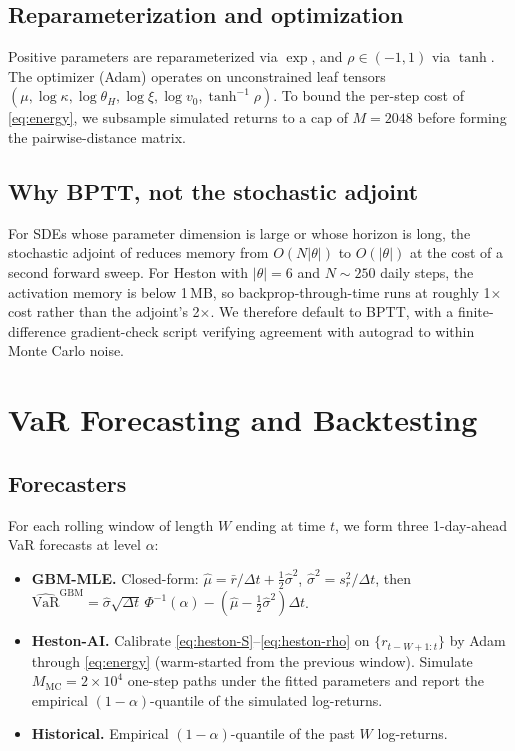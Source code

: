 \documentclass[11pt]{article}
\begin{document}
\subsection{Reparameterization and optimization}

Positive parameters are reparameterized via $\exp$, and $\rho \in (-1, 1)$
via $\tanh$. The optimizer (Adam) operates on unconstrained leaf tensors
$(\mu, \log\kappa, \log\theta_{\!H}, \log\xi, \log v_0, \tanh^{-1}\rho)$. To
bound the per-step cost of \eqref{eq:energy}, we subsample simulated returns
to a cap of $M = 2048$ before forming the pairwise-distance matrix.

\subsection{Why BPTT, not the stochastic adjoint}

For SDEs whose parameter dimension is large or whose horizon is long, the
stochastic adjoint of \cite{li2020adjointsde} reduces memory from
$O(N \lvert\theta\rvert)$ to $O(\lvert\theta\rvert)$ at the cost of a second
forward sweep. For Heston with $\lvert\theta\rvert = 6$ and $N \sim 250$
daily steps, the activation memory is below 1\,MB, so backprop-through-time
runs at roughly 1$\times$ cost rather than the adjoint's 2$\times$. We
therefore default to BPTT, with a finite-difference gradient-check script
verifying agreement with autograd to within Monte Carlo noise.

\section{VaR Forecasting and Backtesting}
\label{sec:var}

\subsection{Forecasters}

For each rolling window of length $W$ ending at time $t$, we form three
1-day-ahead VaR forecasts at level $\alpha$:
\begin{itemize}
\item \textbf{GBM-MLE.} Closed-form: $\hat\mu = \bar r / \Delta t +
  \tfrac{1}{2}\hat\sigma^2$, $\hat\sigma^2 = s_r^2 / \Delta t$, then
  $\widehat{\mathrm{VaR}}^{\mathrm{GBM}} = \hat\sigma\sqrt{\Delta t}\,
  \Phi^{-1}(\alpha) - (\hat\mu - \tfrac{1}{2}\hat\sigma^2)\Delta t$.
\item \textbf{Heston-AI.} Calibrate \eqref{eq:heston-S}--\eqref{eq:heston-rho}
  on $\{r_{t-W+1:t}\}$ by Adam through \eqref{eq:energy} (warm-started from
  the previous window). Simulate $M_{\mathrm{MC}} = 2 \times 10^4$ one-step
  paths under the fitted parameters and report the empirical
  $(1-\alpha)$-quantile of the simulated log-returns.
\item \textbf{Historical.} Empirical $(1-\alpha)$-quantile of the past $W$
  log-returns.
\end{itemize}
\end{document}

